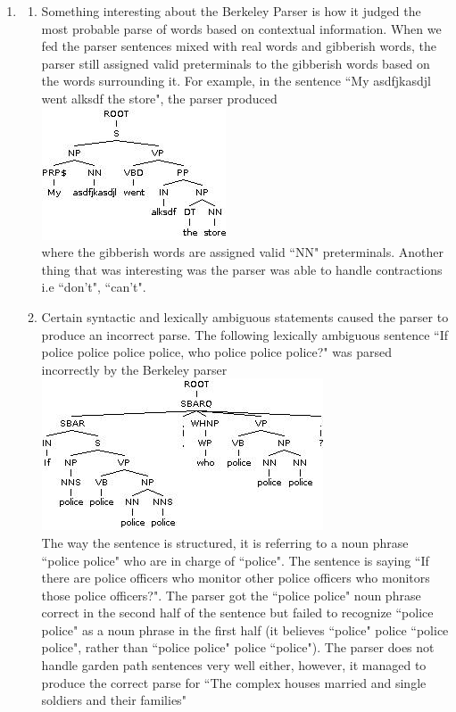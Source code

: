 \documentclass[12pt,a4paper]{article}
\author{Anish Dalal}
\begin{document}
\begin{enumerate}
\item
\begin{enumerate}[label=(\alph*)]
\item Something interesting about the Berkeley Parser is how it judged the most probable parse of words based on contextual information. When we fed the parser sentences mixed with real words and gibberish words, the parser still assigned valid preterminals to the gibberish words based on the words surrounding it. For example, in the sentence ``My asdfjkasdjl went alksdf the store", the parser produced\\
\includegraphics[scale=0.7]{gibparsetree}\\
where the gibberish words are assigned valid ``NN" preterminals. Another thing that was interesting was the parser was able to handle contractions i.e ``don't", ``can't".\\
\item Certain syntactic and lexically ambiguous statements caused the parser to produce an incorrect parse. The following lexically ambiguous sentence ``If police police police police, who police police police?" was parsed incorrectly by the Berkeley parser\\
\includegraphics[scale=0.7]{policepoliceparsetree}\\
The way the sentence is structured, it is referring to a noun phrase ``police police" who are in charge of ``police". The sentence is saying ``If there are police officers who monitor other police officers who monitors those police officers?". The parser got the ``police police" noun phrase correct in the second half of the sentence but failed to recognize ``police police" as a noun phrase in the first half (it believes ``police" police ``police police", rather than ``police police" police ``police").  The parser does not handle garden path sentences very well either, however, it managed to produce the correct parse for ``The complex houses married and single soldiers and their families"\\

\end{enumerate}
\end{enumerate}
\end{document}
